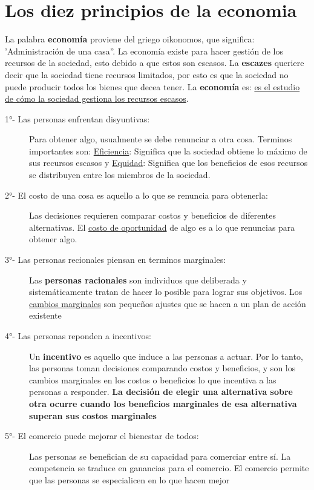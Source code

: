 \section{Los diez principios de la economia}

La palabra \textbf{economía} proviene del griego oikonomos, que significa: 'Administración de una casa''. 
La economía existe para hacer gestión de los recursos de la sociedad, esto debido a que estos son escasos. 
La \textbf{escazes} queriere decir que la sociedad tiene recursos limitados, por esto es que la sociedad no puede
producir todos los bienes que decea tener. La {\bf economía} es: \underline{es el estudio de cómo la sociedad gestiona los recursos escasos}.


\begin{description}
  \item [\large 1°- Las personas enfrentan disyuntivas:] Para obtener algo, usualmente se debe renunciar a otra cosa. Terminos importantes son: \underline{Eficiencia}: Significa que la sociedad obtiene lo máximo de sus recursos escasos y \underline{Equidad}: Significa que los beneficios de esos recursos se distribuyen entre los miembros de la sociedad.
  \item [\large 2°- El costo de una cosa es aquello a lo que se renuncia para obtenerla:] Las decisiones requieren comparar costos y beneficios de diferentes alternativas. El \underline{costo de oportunidad} de algo es a lo que renuncias para obtener algo.
  \item [\large 3°- Las personas recionales piensan en terminos marginales:] Las {\bf personas racionales} son individuos que deliberada y sistemáticamente tratan de hacer lo posible para lograr sus objetivos. Los \underline{cambios marginales} son pequeños ajustes que se hacen a un plan de acción existente
  \item [\large 4°- Las personas reponden a incentivos:] Un {\bf incentivo} es aquello que induce a las personas a actuar. Por lo tanto, las personas toman decisiones comparando costos y beneficios, y son los cambios marginales en los costos o beneficios lo que incentiva a las personas a responder. {\bf La decisión de elegir una alternativa sobre otra ocurre cuando los beneficios marginales de esa alternativa superan sus costos marginales}
  \item [\large 5°- El comercio puede mejorar el bienestar de todos:] Las personas se benefician de su capacidad para comerciar entre sí. La competencia se traduce en ganancias para el comercio. El comercio permite que las personas se especialicen en lo que hacen mejor

\end{description}
